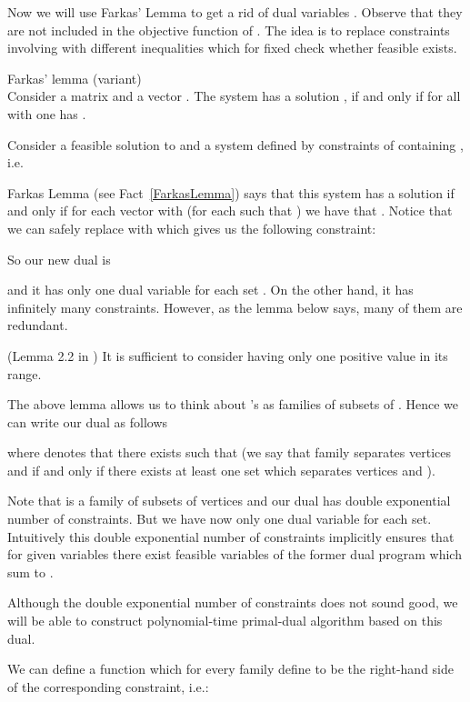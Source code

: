 Now we will use Farkas' Lemma to get a rid of dual variables . Observe that they are not included in the objective function of . The idea is to replace constraints involving  with different inequalities which for fixed  check whether feasible  exists.

\begin{fact} Farkas' lemma (variant)\\
	\label{FarkasLemma}
	Consider a matrix  and a vector . The system  has a solution , if and only if for all  with  one has .
\end{fact}

Consider a feasible solution to  and a system defined by constraints of  containing , i.e.

Farkas Lemma (see Fact~\ref{FarkasLemma}) says that this system has a solution  if and only if for each vector  with  (for each  such that ) we have that .
Notice that we can safely replace  with  which gives us the following constraint:

So our new dual is

and it has only one dual variable  for each set . On the other hand, it has infinitely many constraints. However, as the lemma below says, many of them are redundant.
\begin{lemma} (Lemma 2.2 in \cite{Hajiaghayi})
It is sufficient to consider  having only one positive value in its range.
\end{lemma}

The above lemma allows us to think about 's as families of subsets of . Hence we can write our dual as follows

where  denotes that there exists  such that  (we say that family  separates vertices  and  if and only if there exists at least one set  which separates vertices  and ).

Note that  is a family of subsets of vertices and our dual has double exponential number of constraints. But we have now only one dual variable for each set. Intuitively this double exponential number of constraints implicitly ensures that for given variables  there exist feasible variables  of the former dual program which sum to .

Although the double exponential number of constraints does not sound good, we will be able to construct polynomial-time primal-dual algorithm based on this dual.

We can define a function  which for every family  define  to be the right-hand side of the corresponding constraint, i.e.:


